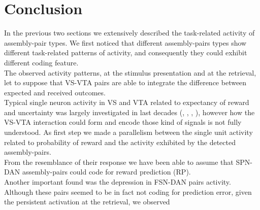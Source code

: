 \section{Conclusion}
In the previous two sections we extensively described the task-related activity of assembly-pair types. We first noticed that different assembly-pairs types show different task-related patterns of activity, and consequently they could exhibit different coding feature.\\The observed activity patterns, at the stimulus presentation and at the retrieval, let to suppose that VS-VTA pairs are able to integrate the difference between expected and received outcomes.\\ Typical single neuron activity in VS and VTA related to expectancy of reward and uncertainty was largely investigated in last decades (\cite{Fiorillo}, \cite{Schultz}, \cite{Schultz1992}, \cite{Schultz1998}), however how the VS-VTA interaction could form and encode those kind of signals is not fully understood. As first step we made a parallelism between the single unit activity related to probability of reward and the activity exhibited by the detected assembly-pairs.\\From the resemblance of their response we have been able to assume that SPN-DAN assembly-pairs could code for reward prediction (RP).\\Another important found was the depression in FSN-DAN pairs activity. Although these pairs seemed to be in fact not coding for prediction error, given the persistent activation at the retrieval, we observed %
